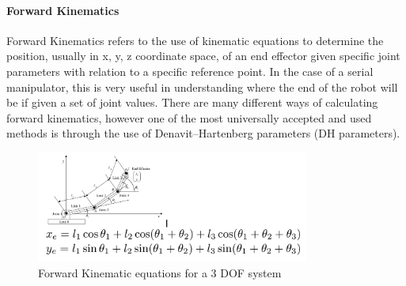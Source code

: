     \paragraph{Forward Kinematics}
    Forward Kinematics refers to the use of kinematic equations to determine the position, usually in x, y, z coordinate space, of an end effector given specific joint parameters with relation to a specific reference point. In the case of a serial manipulator, this is very useful in understanding where the end of the robot will be if given a set of joint values. There are many different ways of calculating forward kinematics, however one of the most universally accepted and used methods is through the use of Denavit–Hartenberg parameters (DH parameters).
    \begin{figure}[H]
        \centering
        \includegraphics[width=0.8\textwidth]{3dof.PNG}
        \caption{Forward Kinematic equations for a 3 DOF system}
        \label{fig:my_label}
    \end{figure}
